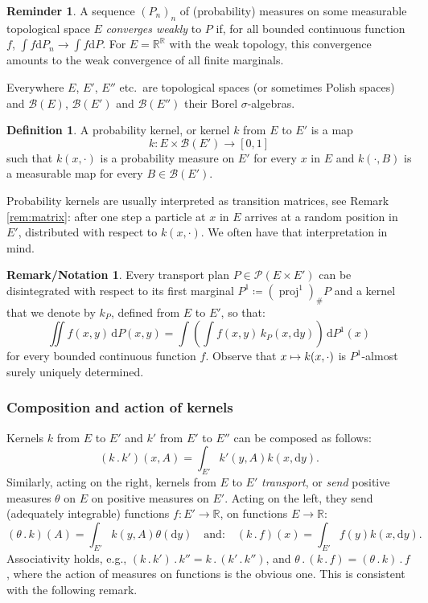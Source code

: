 \documentclass[10pt,a4paper]{article}
\newcommand{\ldot}{\mathbin{.}}
\newcommand\mto{\mathchoice{\longmapsto}{\mapsto}{\mapsto}{\mapsto}}
\theoremstyle{plain}
\theoremstyle{definition}
\newtheorem{defi}[them]{Definition}
\newtheorem{remnotation}[them]{Remark/Notation} %
\newtheorem{reminder}[them]{Reminder}
\newcommand{\dd}{\mathrm{d}}
\newcommand{\eqdefup}{\coloneqq}
\newcommand{\p}{\mathcal{P}}
\newcommand{\R}{\mathbb{R}}
\newcommand{\pr}{\operatorname{proj}}
\begin{document}
\begin{reminder}\label{reminder:weak_convergence} A sequence $(P_n)_n$ of (probability) measures on some measurable topological space $E$ \emph{converges weakly} to $P$ if, for all bounded continuous function $f$, $\int f\dd P_n\to\int f\dd P$. For $E=\R^\R$ with the weak topology, this convergence amounts to the weak convergence of all finite marginals.
\end{reminder}

Everywhere $E$, $E'$, $E''$ etc.\ are topological spaces (or sometimes Polish spaces) and $\mathcal{B}(E)$, $\mathcal{B}(E')$ and $\mathcal{B}(E'')$ their Borel $\sigma$-algebras.

\begin{defi}
A probability kernel, or kernel $k$ from $E$ to $E'$ is a map\vspace*{-3pt}\enlargethispage{.5\baselineskip}%
\[
k:E\times \mathcal{B}(E')\to [0,1]
\]
such that $k(x,\cdot)$ is a probability measure on $E'$ for every $x$ in $E$ and $k(\cdot,B)$ is a measurable map for every $B\in {\mathcal B}(E')$.
\end{defi}

Probability kernels are usually interpreted as transition matrices, see Remark \ref{rem:matrix}: after one step a particle at $x$ in $E$ arrives at a random position in $E'$, distributed with respect to $k(x,\cdot)$. We often have that interpretation in mind.

\begin{remnotation}\label{notation:k_P}Every transport plan $P\in\p(E\times E')$ can be disintegrated with respect to its first marginal $P^1\eqdefup(\pr^1)_\#P$ and a kernel that we denote by $k_P$, defined from $E$ to $E'$, so that:\vspace*{-3pt}
\[\iint f(x,y)\,\dd P(x,y)=\int\left(\int f(x,y)\,k_P(x,\dd y)\right)\,\dd P^1(x)\]
for every bounded continuous function $f$. Observe that $x\mto k(x,\cdot)$ is $P^1$-almost surely uniquely determined.
\end{remnotation}

\subsubsection{Composition and action of kernels}\label{ss:compos} Kernels $k$ from $E$ to $E'$ and $k'$ from $E'$ to $E''$ can be composed as follows:\vspace*{-3pt}
\[(k\ldot k')(x,A)=\int_{E'} k'(y,A) k(x,\dd y).\]
Similarly, acting on the right, kernels from $E$ to $E'$ \emph{transport}, or \emph{send} positive measures $\theta$ on $E$ on positive measures on $E'$. Acting on the left, they send (adequately integrable) functions $f:E'\to \R$, on functions $E\to \R$:\vspace*{-3pt}
\[(\theta\ldot k)(A)=\int_{E'}k(y,A)\theta(\dd y)\quad \text{and:}\quad (k\ldot f)(x)=\int_{E'} f(y) k(x,\dd y).\]
\noindent Associativity holds, e.g., $(k\ldot k')\ldot k''=k\ldot(k'\ldot k'')$, and $\theta\ldot(k\ldot f)=(\theta\ldot k)\ldot f$, where the action of measures on functions is the obvious one. This is consistent with the following remark.
\end{document}
